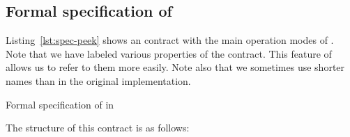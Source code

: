 \subsection{Formal specification of \peek}
\label{sec:formal-specification-peek}


Listing~\ref{lst:spec-peek} shows an \acsl contract with the 
main operation modes of \peek.
Note that we have labeled various properties of the contract.
This feature of \acsl allows us to refer to them more easily.
Note also that we sometimes use shorter names than in the original implementation.

\begin{listing}[hbt]
\begin{minipage}{\textwidth}

\end{minipage}
\caption{\label{lst:spec-peek} Formal specification of \peek in \acsl}
\end{listing}

The structure of this contract is as follows:

